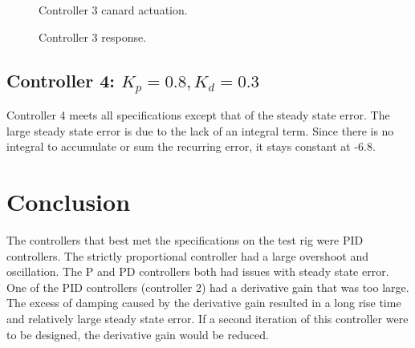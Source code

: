 \documentclass[12pt]{article}
\begin{document}
\begin{figure}[h]
    \centering
    \begin{minipage}{.5\textwidth}
        \centering
        \captionsetup{justification=centering, margin=0.5cm}
        \scalebox{0.55}{}
        \caption{Controller 3 canard actuation.}
        \label{fig:commanded3}
    \end{minipage}%
    \begin{minipage}{.5\textwidth}
        \centering
        \captionsetup{justification=centering, margin=0.5cm}
        \scalebox{0.55}{}
        \label{fig:commanded5}
    \end{minipage}
    \end{figure}
\begin{figure}[h]
\centering
\begin{minipage}{.5\textwidth}
    \centering
    \captionsetup{justification=centering, margin=0.5cm}
    \scalebox{0.55}{}
    \caption{Controller 3 response.}
    \label{fig:response3}
\end{minipage}%
\begin{minipage}{.5\textwidth}
    \centering
    \captionsetup{justification=centering, margin=0.5cm}
    \scalebox{0.55}{}
    \label{fig:response4}
\end{minipage}
\end{figure}

\subsection{Controller 4: $K_p = 0.8, K_d = 0.3$}
    Controller 4 meets all specifications except that of the steady state error. The large steady state error is due to the lack of an integral term. Since there is no integral to accumulate or sum the recurring error, it stays constant at -6.8\degree.

\begin{figure}[h]
    \centering
    \scalebox{0.55}{}
\end{figure}

\section{Conclusion}
The controllers that best met the specifications on the test rig were PID controllers. The strictly proportional controller had a large overshoot and oscillation. The P and PD controllers both had issues with steady state error. One of the PID controllers (controller 2) had a derivative gain that was too large. The excess of damping caused by the derivative gain resulted in a long rise time and relatively large steady state error. If a second iteration of this controller were to be designed, the derivative gain would be reduced.
\end{document}

